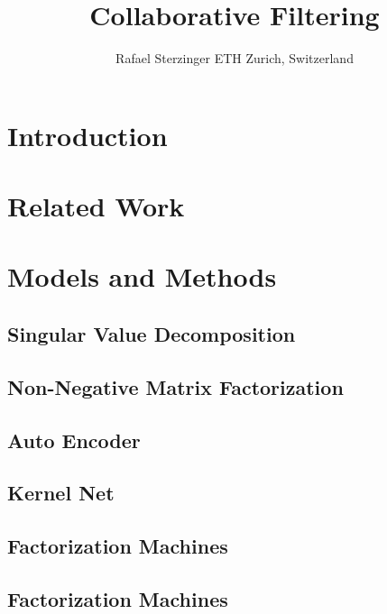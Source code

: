 \documentclass[10pt,conference,compsocconf]{IEEEtran}
\begin{document}
    \title{Collaborative Filtering}

    \author{
    Rafael Sterzinger
    ETH Zurich, Switzerland
    }

    \maketitle

    \begin{abstract}

    \end{abstract}


    \section{Introduction}
    \section{Related Work}


    \section{Models and Methods}

    \subsection{Singular Value Decomposition}

    \subsection{Non-Negative Matrix Factorization}

    \subsection{Auto Encoder}

    \subsection{Kernel Net}

    \subsection{Factorization Machines}

    \subsection{Factorization Machines}
    
\end{document}
